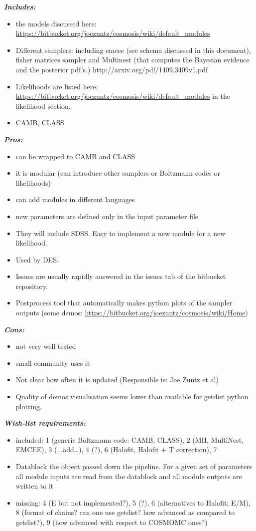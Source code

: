 {\it \bf Includes: }
\begin{itemize}
\item the models discussed here: \url{https://bitbucket.org/joezuntz/cosmosis/wiki/default_modules}
 \item Different samplers: including emcee (see schema discussed in this document), fisher matrices sampler and Multinest (that computes the Bayesian evidence and the posterior pdf's.) http://arxiv.org/pdf/1409.3409v1.pdf
 \item Likelihoods are listed here: \url{https://bitbucket.org/joezuntz/cosmosis/wiki/default_modules} in the likelihood section.
 \item CAMB, CLASS
\end{itemize}

{\it \bf Pros:} 
\begin{itemize}
 \item can be wrapped to CAMB and CLASS
 \item it is modular (can introduce other samplers or Boltzmann codes or likelihoods) 
 \item can add modules in different languages
 \item new parameters are defined only in the input parameter file
 \item They will include SDSS. Easy to implement a new module for a new likelihood.
 \item Used by DES.
 \item Issues are usually rapidly answered in the issues tab of the bitbucket repository.
 \item Postprocess tool that automatically makes python plots of the sampler outputs (some demos: \url{https://bitbucket.org/joezuntz/cosmosis/wiki/Home})
\end{itemize}

{\it \bf Cons:} 
\begin{itemize}
 \item not very well tested
 \item small community uses it
 \item Not clear how often it is updated (Responsible is: Joe Zuntz et al) 
 \item Quality of demos visualisation seems lower than available for getdist python plotting.
\end{itemize}

{\it \bf Wish-list requirements: }
\begin{itemize}
 \item included: 1 (generic Boltzmann code: CAMB, CLASS), 2 (MH, MultiNest, EMCEE), 3 (...add…), 4 (?), 6 (Halofit, Halofit + T correction), 7
 \item Datablock the object passed down the pipeline. For a given set of parameters all module inputs are read from the datablock and all module outputs are written to it 
 \item missing: 4 (E but not implemented?), 5 (?), 6 (alternatives to Halofit; E/M), 8 (format of chains? can one use getdist? how advanced as compared to getdist?), 9 
 (how advanced with respect to COSMOMC ones?) 
\end{itemize}

